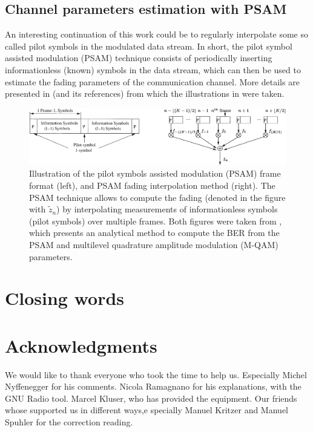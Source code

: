 \subsection{Channel parameters estimation with PSAM}

An interesting continuation of this work could be to regularly interpolate some so called pilot symbols in the modulated data stream. In short, the pilot symbol assisted modulation (PSAM) technique consists of periodically inserting informationless (known) symbols in the data stream, which can then be used to estimate the fading parameters of the communication channel. More details are presented in \cite{Xiaoyi1999} (and its references) from which the illustrations in  were taken.

\begin{figure}
	\centering
	\includegraphics[width = \linewidth]{figures/xiaoyi-psam-figures}
	\caption{
		Illustration of the pilot symbols assisted modulation (PSAM) frame format (left), and PSAM fading interpolation method (right). The PSAM technique allows to compute the fading (denoted in the figure with \(\tilde{z}_n\)) by interpolating measurements of informationless symbols (pilot symbols) over multiple frames. Both figures were taken from \cite{Xiaoyi1999}, which presents an analytical method to compute the BER from the PSAM and multilevel quadrature amplitude modulation (M-QAM) parameters.
		\label{fig:psam}
	}
\end{figure}

\section{Closing words}


\section{Acknowledgments}


We would like to thank everyone who took the time to help us. Especially Michel Nyffenegger for his comments. Nicola Ramagnano for his explanations, with the GNU Radio tool. Marcel Kluser, who has provided the equipment. Our friends whose supported us in different ways,e specially Manuel Kritzer and Manuel Spuhler for the correction reading.




